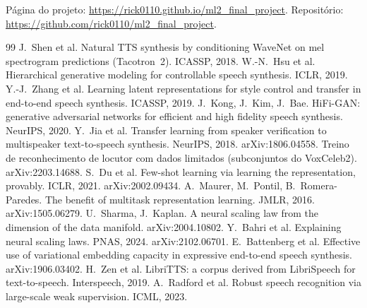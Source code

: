 \documentclass[a4paper,11pt]{article}
\begin{document}
Página do projeto: \url{https://rick0110.github.io/ml2_final_project}. Repositório: \url{https://github.com/rick0110/ml2_final_project}.

\begin{thebibliography}{99}\small
{} J.~Shen et al. Natural TTS synthesis by conditioning WaveNet on mel spectrogram predictions (Tacotron~2). ICASSP, 2018.
 W.-N.~Hsu et al. Hierarchical generative modeling for controllable speech synthesis. ICLR, 2019.
 Y.-J.~Zhang et al. Learning latent representations for style control and transfer in end-to-end speech synthesis. ICASSP, 2019.
 J.~Kong, J.~Kim, J.~Bae. HiFi-GAN: generative adversarial networks for efficient and high fidelity speech synthesis. NeurIPS, 2020.
 Y.~Jia et al. Transfer learning from speaker verification to multispeaker text-to-speech synthesis. NeurIPS, 2018. arXiv:1806.04558.
 Treino de reconhecimento de locutor com dados limitados (subconjuntos do VoxCeleb2). arXiv:2203.14688.
 S.~Du et al. Few-shot learning via learning the representation, provably. ICLR, 2021. arXiv:2002.09434.
 A.~Maurer, M.~Pontil, B.~Romera-Paredes. The benefit of multitask representation learning. JMLR, 2016. arXiv:1505.06279.
 U.~Sharma, J.~Kaplan. A neural scaling law from the dimension of the data manifold. arXiv:2004.10802.
 Y.~Bahri et al. Explaining neural scaling laws. PNAS, 2024. arXiv:2102.06701.
 E.~Battenberg et al. Effective use of variational embedding capacity in expressive end-to-end speech synthesis. arXiv:1906.03402.
 H.~Zen et al. LibriTTS: a corpus derived from LibriSpeech for text-to-speech. Interspeech, 2019.
 A.~Radford et al. Robust speech recognition via large-scale weak supervision. ICML, 2023.
\end{thebibliography}
\end{document}
